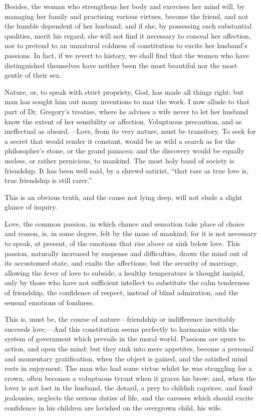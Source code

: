 Besides, the woman who strengthens her body and exercises her mind
will, by managing her family and practising various virtues, become
the friend, and not the humble dependent of her husband; and if she,
by possessing such substantial qualities, merit his regard, she will
not find it necessary to conceal her affection, nor to pretend to an
unnatural coldness of constitution to excite her husband's passions.
In fact, if we revert to history, we shall find that the women who
have distinguished themselves have neither been the most beautiful nor
the most gentle of their sex.

Nature, or, to speak with strict propriety, God, has made all things
right; but man has sought him out many inventions to mar the work. I
now allude to that part of Dr. Gregory's treatise, where he advises a
wife never to let her husband know the extent of her sensibility or
affection. Voluptuous precaution, and as ineffectual as
absurd.---Love, from its very nature, must be transitory. To 
seek for a secret that would render it constant, would be as wild a
search as for the philosopher's stone, or the grand panacea: and the
discovery would be equally useless, or rather pernicious, to mankind.
The most holy band of society is friendship. It has been well said, by
a shrewd satirist, ``that rare as true love is, true friendship is
still rarer.''

This is an obvious truth, and the cause not lying deep, will not elude
a slight glance of inquiry.

Love, the common passion, in which chance and sensation take place of
choice and reason, is, in some degree, felt by the mass of mankind;
for it is not necessary to speak, at present, of the emotions that
rise above or sink below love. This passion, naturally increased by
suspense and difficulties, draws the mind out of its accustomed state,
and exalts the affections; but the security of marriage, allowing the
fever of love to subside, a healthy temperature is thought insipid,
only by those who have not sufficient intellect to substitute the calm
tenderness of friendship, the confidence of respect, instead of blind
admiration, and the sensual emotions of fondness.

This is, must be, the course of nature---friendship or
indifference inevitably succeeds love.---And this constitution seems
perfectly to harmonize with the system of government which prevails in
the moral world. Passions are spurs to action, and open the mind; but
they sink into mere appetites, become a personal and momentary
gratification, when the object is gained, and the satisfied mind rests
in enjoyment. The man who had some virtue whilst he was struggling for
a crown, often becomes a voluptuous tyrant when it graces his brow;
and, when the lover is not lost in the husband, the dotard, a prey to
childish caprices, and fond jealousies, neglects the serious duties of
life, and the caresses which should excite confidence in his
children are lavished on the overgrown child, his wife.

